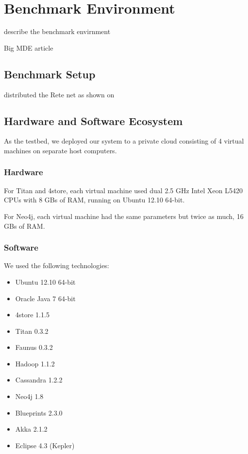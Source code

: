 \section{Benchmark Environment}
\label{sec:benchmark-environment}

describe the benchmark envirnment


Big MDE article \cite{Izso:2013:IIG:2487766.2487772}



\subsection{Benchmark Setup}


distributed the Rete net as shown on 


\subsection{Hardware and Software Ecosystem}

As the testbed, we deployed our system to a private cloud consisting of 4 virtual machines on separate host computers. 

\subsubsection{Hardware}
 
For Titan and 4store, each virtual machine used dual 2.5 GHz Intel Xeon L5420 CPUs with 8 GBs of RAM, running on Ubuntu 12.10 64-bit.

For Neo4j, each virtual machine had the same parameters but twice as much, 16 GBs of RAM. 

\subsubsection{Software}

We used the following technologies:

\begin{itemize}
  \item Ubuntu 12.10 64-bit
  \item Oracle Java 7 64-bit
  \item 4store 1.1.5
  \item Titan 0.3.2
  \item Faunus 0.3.2
  \item Hadoop 1.1.2
  \item Cassandra 1.2.2
  \item Neo4j 1.8
  \item Blueprints 2.3.0
  \item Akka 2.1.2
  \item Eclipse 4.3 (Kepler)
\end{itemize}

